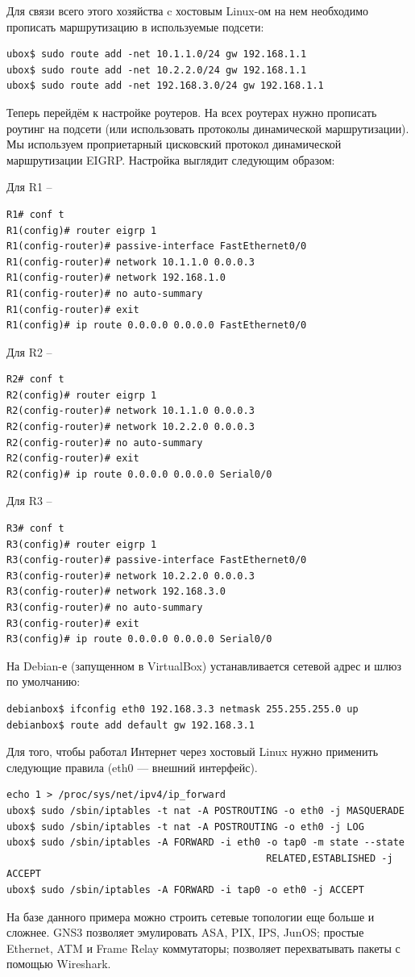 Для связи всего этого хозяйства c хостовым Linux-ом на нем необходимо прописать маршрутизацию в используемые подсети:
\begin{Verbatim}[frame=single]
ubox$ sudo route add -net 10.1.1.0/24 gw 192.168.1.1
ubox$ sudo route add -net 10.2.2.0/24 gw 192.168.1.1
ubox$ sudo route add -net 192.168.3.0/24 gw 192.168.1.1
\end{Verbatim}

Теперь перейдём к настройке роутеров. На всех роутерах нужно прописать роутинг на подсети (или использовать протоколы динамической маршрутизации). Мы используем проприетарный цисковский протокол динамической маршрутизации EIGRP. Настройка выглядит следующим образом:

Для R1 --

\begin{Verbatim}[frame=single]
R1# conf t
R1(config)# router eigrp 1
R1(config-router)# passive-interface FastEthernet0/0
R1(config-router)# network 10.1.1.0 0.0.0.3
R1(config-router)# network 192.168.1.0
R1(config-router)# no auto-summary
R1(config-router)# exit
R1(config)# ip route 0.0.0.0 0.0.0.0 FastEthernet0/0
\end{Verbatim}

Для R2 --

\begin{Verbatim}[frame=single]
R2# conf t
R2(config)# router eigrp 1
R2(config-router)# network 10.1.1.0 0.0.0.3
R2(config-router)# network 10.2.2.0 0.0.0.3
R2(config-router)# no auto-summary
R2(config-router)# exit
R2(config)# ip route 0.0.0.0 0.0.0.0 Serial0/0
\end{Verbatim}

Для R3 --

\begin{Verbatim}[frame=single]
R3# conf t
R3(config)# router eigrp 1
R3(config-router)# passive-interface FastEthernet0/0
R3(config-router)# network 10.2.2.0 0.0.0.3
R3(config-router)# network 192.168.3.0
R3(config-router)# no auto-summary
R3(config-router)# exit
R3(config)# ip route 0.0.0.0 0.0.0.0 Serial0/0
\end{Verbatim}

На Debian-е (запущенном в VirtualBox) устанавливается сетевой адрес и шлюз по умолчанию:
\begin{Verbatim}[frame=single]
debianbox$ ifconfig eth0 192.168.3.3 netmask 255.255.255.0 up
debianbox$ route add default gw 192.168.3.1
\end{Verbatim}

Для того, чтобы работал Интернет через хостовый Linux нужно применить следующие правила (eth0 — внешний интерфейс).
\begin{Verbatim}[frame=single]
echo 1 > /proc/sys/net/ipv4/ip_forward
ubox$ sudo /sbin/iptables -t nat -A POSTROUTING -o eth0 -j MASQUERADE
ubox$ sudo /sbin/iptables -t nat -A POSTROUTING -o eth0 -j LOG
ubox$ sudo /sbin/iptables -A FORWARD -i eth0 -o tap0 -m state --state 
                                             RELATED,ESTABLISHED -j ACCEPT
ubox$ sudo /sbin/iptables -A FORWARD -i tap0 -o eth0 -j ACCEPT
\end{Verbatim}

На базе данного примера можно строить сетевые топологии еще больше и сложнее. GNS3 позволяет эмулировать ASA, PIX, IPS, JunOS; простые Ethernet, ATM и Frame Relay коммутаторы; позволяет перехватывать пакеты с помощью Wireshark.